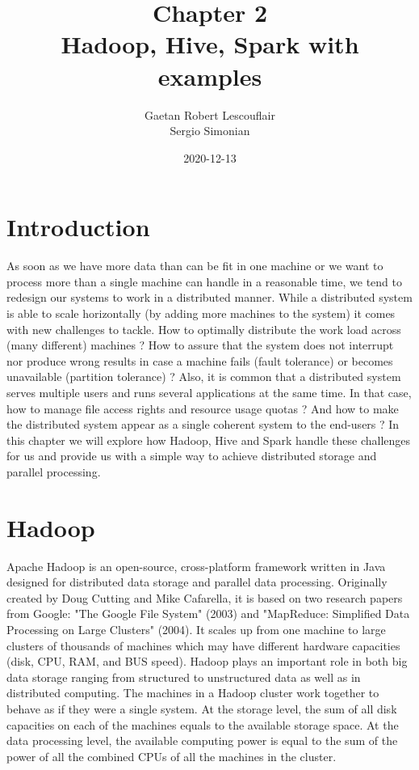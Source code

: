 \documentclass[12pt,english]{book}
\title{Chapter 2\\
Hadoop, Hive, Spark with examples
}
\date{2020-12-13}
\author{Gaetan Robert Lescouflair\\Sergio Simonian}
\begin{document}
\maketitle
\newpage
{}
\setcounter{chapter}{2}
\setcounter{secnumdepth}{3}	
\setlength\arrayrulewidth{1pt}

\section{Introduction}


As soon as we have more data than can be fit in one machine or we want to process more than a single machine can handle in a reasonable time, we tend to redesign our systems to work in a distributed manner.
While a distributed system is able to scale horizontally (by adding more machines to the system) it comes with new challenges to tackle.
How to optimally distribute the work load across (many different) machines ?
How to assure that the system does not interrupt nor produce wrong results in case a machine fails (fault tolerance) or becomes unavailable (partition tolerance) ?
Also, it is common that a distributed system serves multiple users and runs several applications at the same time.
In that case, how to manage file access rights and resource usage quotas ?
And how to make the distributed system appear as a single coherent system to the end-users ?
In this chapter we will explore how Hadoop, Hive and Spark handle these challenges for us and provide us with a simple way to achieve distributed storage and parallel processing.
 

\section{Hadoop}


Apache Hadoop is an open-source, cross-platform framework written in Java designed for distributed data storage and parallel data processing.
Originally created by Doug Cutting and Mike Cafarella, it is based on two research papers from Google: "The Google File System" (2003) and "MapReduce: Simplified Data Processing on Large Clusters" (2004).
It scales up from one machine to large clusters of thousands of machines which may have different hardware capacities (disk, CPU, RAM, and BUS speed).
Hadoop plays an important role in both big data storage ranging from structured to unstructured data as well as in distributed computing.
The machines in a Hadoop cluster work together to behave as if they were a single system.
At the storage level, the sum of all disk capacities on each of the machines equals to the available storage space.
At the data processing level, the available computing power is equal to the sum of the power of all the combined CPUs of all the machines in the cluster.
\end{document}
